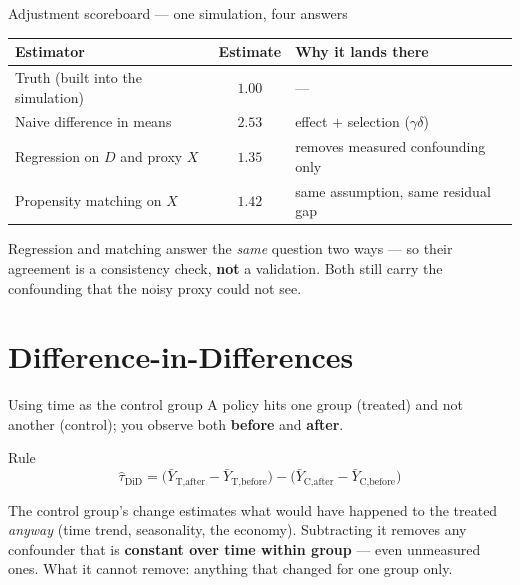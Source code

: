 \documentclass[aspectratio=169,11pt]{beamer}
\begin{document}
\begin{frame}{Adjustment scoreboard --- one simulation, four answers}
  \begin{center}
  \footnotesize
  \begin{tabular}{@{}lcl@{}}
    \toprule
    \textbf{Estimator} & \textbf{Estimate} & \textbf{Why it lands there} \\
    \midrule
    Truth (built into the simulation) & $1.00$ & --- \\
    Naive difference in means & $2.53$ & effect $+$ selection ($\gamma\delta$) \\
    Regression on $D$ and proxy $X$ & $1.35$ & removes measured confounding only \\
    Propensity matching on $X$ & $1.42$ & same assumption, same residual gap \\
    \bottomrule
  \end{tabular}
  \end{center}
  \begin{takeaway}
    Regression and matching answer the \emph{same} question two ways --- so their
    agreement is a consistency check, \textbf{not} a validation. Both still carry
    the confounding that the noisy proxy could not see.
  \end{takeaway}
\end{frame}

\section{Difference-in-Differences}

\begin{frame}{Using time as the control group}
  A policy hits one group (treated) and not another (control); you observe both
  \textbf{before} and \textbf{after}.
  \begin{block}{Rule}
    \[
      \boxed{\;\hat\tau_{\text{DiD}}
        = \big(\bar Y_{\text{T,after}} - \bar Y_{\text{T,before}}\big)
        - \big(\bar Y_{\text{C,after}} - \bar Y_{\text{C,before}}\big)\;}
    \]
  \end{block}
  \begin{readme}
    The control group's change estimates what would have happened to the treated
    \emph{anyway} (time trend, seasonality, the economy). Subtracting it removes any
    confounder that is \textbf{constant over time within group} --- even unmeasured
    ones. What it cannot remove: anything that changed for one group only.
  \end{readme}
\end{frame}
\end{document}
